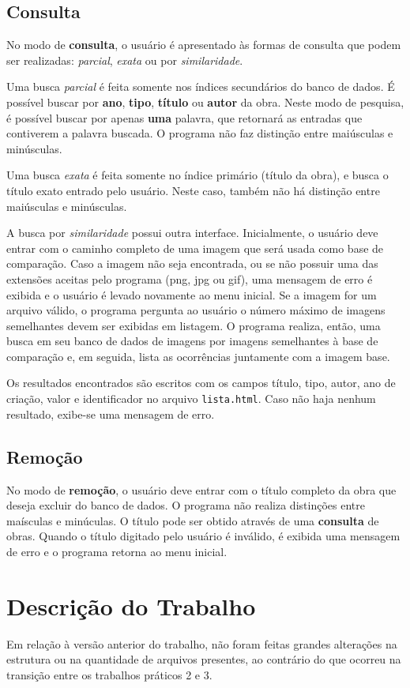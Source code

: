 \documentclass[a4paper,10pt]{article}
\begin{document}
\subsection{Consulta}
No modo de \textbf{consulta}, o usuário é apresentado às formas de consulta que podem ser realizadas: \textit{parcial}, \textit{exata} ou por \textit{similaridade}.

Uma busca \textit{parcial} é feita somente nos índices secundários do banco de dados. É possível buscar por \textbf{ano}, \textbf{tipo}, \textbf{título} ou \textbf{autor} da obra. Neste modo de pesquisa, é possível buscar por apenas \textbf{uma} palavra, que retornará as entradas que contiverem a palavra buscada. O programa não faz distinção entre maiúsculas e minúsculas.

Uma busca \textit{exata} é feita somente no índice primário (título da obra), e busca o título exato entrado pelo usuário. Neste caso, também não há distinção entre maiúsculas e minúsculas.

A busca por \textit{similaridade} possui outra interface. Inicialmente, o usuário deve entrar com o caminho completo de uma imagem que será usada como base de comparação. Caso a imagem não seja encontrada, ou se não possuir uma das extensões aceitas pelo programa (png, jpg ou gif), uma mensagem de erro é exibida e o usuário é levado novamente ao menu inicial. Se a imagem for um arquivo válido, o programa pergunta ao usuário o número máximo de imagens semelhantes devem ser exibidas em listagem. O programa realiza, então, uma busca em seu banco de dados de imagens por imagens semelhantes à base de comparação e, em seguida, lista as ocorrências juntamente com a imagem base.

Os resultados encontrados são escritos com os campos título, tipo, autor, ano de criação, valor e identificador no arquivo \texttt{lista.html}. Caso não haja nenhum resultado, exibe-se uma mensagem de erro.

\subsection{Remoção}
No modo de \textbf{remoção}, o usuário deve entrar com o título completo da obra que deseja excluir do banco de dados. O programa não realiza distinções entre maísculas e minúculas. O título pode ser obtido através de uma \textbf{consulta} de obras. Quando o título digitado pelo usuário é inválido, é exibida uma mensagem de erro e o programa retorna ao menu inicial.

\section{Descrição do Trabalho}
Em relação à versão anterior do trabalho, não foram feitas grandes alterações na estrutura ou na quantidade de arquivos presentes, ao contrário do que ocorreu na transição entre os trabalhos práticos 2 e 3.
\end{document}
